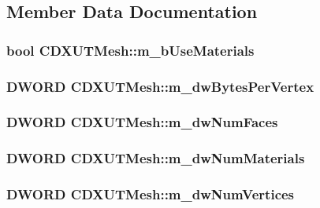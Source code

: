 \subsection{Member Data Documentation}
\hypertarget{class_c_d_x_u_t_mesh_a064834382ef044a6cb236f680e62fd7e}{
\subsubsection[{m\_\-bUseMaterials}]{\setlength{\rightskip}{0pt plus 5cm}bool {\bf CDXUTMesh::m\_\-bUseMaterials}}}
\label{class_c_d_x_u_t_mesh_a064834382ef044a6cb236f680e62fd7e}
\hypertarget{class_c_d_x_u_t_mesh_aad7b61edfcd1123bbc8ce2968c1e4e89}{
\subsubsection[{m\_\-dwBytesPerVertex}]{\setlength{\rightskip}{0pt plus 5cm}DWORD {\bf CDXUTMesh::m\_\-dwBytesPerVertex}}}
\label{class_c_d_x_u_t_mesh_aad7b61edfcd1123bbc8ce2968c1e4e89}
\hypertarget{class_c_d_x_u_t_mesh_adfe36cbbc1e8e934423cacee8718d869}{
\subsubsection[{m\_\-dwNumFaces}]{\setlength{\rightskip}{0pt plus 5cm}DWORD {\bf CDXUTMesh::m\_\-dwNumFaces}}}
\label{class_c_d_x_u_t_mesh_adfe36cbbc1e8e934423cacee8718d869}
\hypertarget{class_c_d_x_u_t_mesh_a293ea66f6e3f20ebbcbbb694b1ec4abc}{
\subsubsection[{m\_\-dwNumMaterials}]{\setlength{\rightskip}{0pt plus 5cm}DWORD {\bf CDXUTMesh::m\_\-dwNumMaterials}}}
\label{class_c_d_x_u_t_mesh_a293ea66f6e3f20ebbcbbb694b1ec4abc}
\hypertarget{class_c_d_x_u_t_mesh_ad63cb9f8b37ad5f2d0b025814d316387}{
\subsubsection[{m\_\-dwNumVertices}]{\setlength{\rightskip}{0pt plus 5cm}DWORD {\bf CDXUTMesh::m\_\-dwNumVertices}}}
